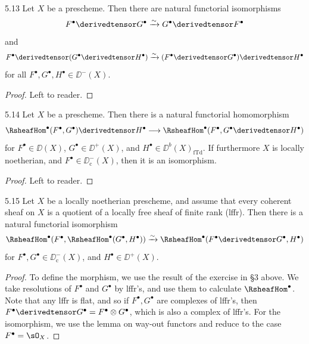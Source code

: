 \begin{bookproposition}{5.13}\label{prop:2.5.13}
Let $X$ be a prescheme. Then there are natural functorial isomorphisms
\[
F^\bullet\derivedtensor G^\bullet \xrightarrow{\sim} G^\bullet\derivedtensor F^\bullet
\]
and
\[
F^\bullet\derivedtensor (G^\bullet\derivedtensor H^\bullet) \xrightarrow{\sim} (F^\bullet\derivedtensor G^\bullet)\derivedtensor H^\bullet
\]
for all $F^\bullet,G^\bullet,H^\bullet\in\DD^-(X)$.
\end{bookproposition}

\begin{proof}
Left to reader.
\end{proof}

\begin{bookproposition}{5.14}\label{prop:2.5.14}
Let $X$ be a prescheme. Then there is a natural functorial homomorphism
\[
\RsheafHom^\bullet(F^\bullet,G^\bullet)\derivedtensor H^\bullet \longrightarrow \RsheafHom^\bullet(F^\bullet, G^\bullet\derivedtensor H^\bullet)
\]
for $F^\bullet\in\DD(X)$, $G^\bullet\in\DD^+(X)$, and $H^\bullet\in\DD^b(X)_{\mathrm{fTd}}$. If furthermore $X$ is locally noetherian, and $F^\bullet\in\DD_{\mathrm{c}}^-(X)$, then it is an isomorphism.
\end{bookproposition}

\begin{proof}
Left to reader.
\end{proof}

\begin{bookproposition}{5.15}\label{prop:2.5.15}
Let $X$ be a locally noetherian prescheme, and assume that every coherent sheaf on $X$ is a quotient of a locally free sheaf of finite rank (lffr). Then there is a natural functorial isomorphism
\[
\RsheafHom^\bullet(F^\bullet, \RsheafHom^\bullet(G^\bullet, H^\bullet)) \xrightarrow{\sim} \RsheafHom^\bullet(F^\bullet\derivedtensor G^\bullet, H^\bullet)
\]
for $F^\bullet,G^\bullet\in\DD_{\mathrm{c}}^-(X)$, and $H^\bullet\in\DD^+(X)$.
\end{bookproposition}

\begin{proof}
To define the morphism, we use the result of the exercise in \S3 above. We take resolutions of $F^\bullet$ and $G^\bullet$ by lffr's, and use them to calculate $\RsheafHom^\bullet$. Note that any lffr is flat, and so if $F^\bullet,G^\bullet$ are complexes of lffr's, then $F^\bullet\derivedtensor G^\bullet=F^\bullet\otimes G^\bullet$, which is also a complex of lffr's. For the isomorphism, we use the lemma on way-out functors and reduce to the case $F^\bullet=\sO_X$.
\end{proof}

